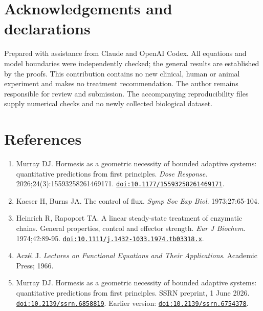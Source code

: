 \documentclass[
  11pt,
  a4paper,
]{article}
\providecommand{\tightlist}{%
  \setlength{\itemsep}{0pt}\setlength{\parskip}{0pt}}
\begin{document}
\section{Acknowledgements and declarations}\label{acknowledgements-and-declarations}

Prepared with assistance from Claude and OpenAI Codex. All equations and model boundaries were independently checked; the general results are established by the proofs. This contribution contains no new clinical, human or animal experiment and makes no treatment recommendation. The author remains responsible for review and submission. The accompanying reproducibility files supply numerical checks and no newly collected biological dataset.

\section{References}\label{references}

\begin{enumerate}
\def\labelenumi{\arabic{enumi}.}
\tightlist
\item
  Murray DJ. Hormesis as a geometric necessity of bounded adaptive systems: quantitative predictions from first principles. \emph{Dose Response}. 2026;24(3):15593258261469171. \href{https://doi.org/10.1177/15593258261469171}{\nolinkurl{doi:10.1177/15593258261469171}}.
\item
  Kacser H, Burns JA. The control of flux. \emph{Symp Soc Exp Biol}. 1973;27:65-104.
\item
  Heinrich R, Rapoport TA. A linear steady-state treatment of enzymatic chains. General properties, control and effector strength. \emph{Eur J Biochem}. 1974;42:89-95. \href{https://doi.org/10.1111/j.1432-1033.1974.tb03318.x}{\nolinkurl{doi:10.1111/j.1432-1033.1974.tb03318.x}}.
\item
  Aczél J. \emph{Lectures on Functional Equations and Their Applications}. Academic Press; 1966.
\item
  Murray DJ. Hormesis as a geometric necessity of bounded adaptive systems: quantitative predictions from first principles. SSRN preprint, 1 June 2026. \href{https://doi.org/10.2139/ssrn.6858819}{\nolinkurl{doi:10.2139/ssrn.6858819}}. Earlier version: \href{https://doi.org/10.2139/ssrn.6754378}{\nolinkurl{doi:10.2139/ssrn.6754378}}.
\end{enumerate}
\end{document}
